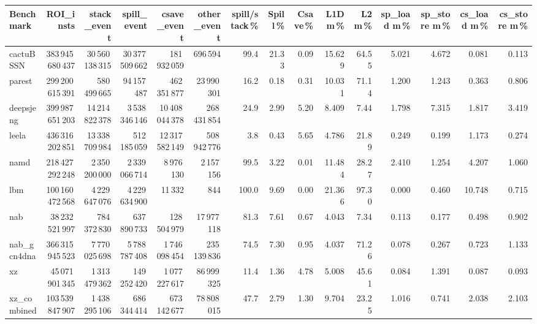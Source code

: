 \documentclass[9pt,landscape,a4paper]{article}
\begin{document}
\vspace{2mm}
\centering
\begin{adjustbox}{max width=\textwidth, max totalheight=0.50\textheight}%
\begin{tabular}{lrrrrrrrrrrrrrr}
\toprule
Benchmark & ROI\_insts & stack\_event & \textbf{spill\_event} & csave\_event & other\_event & spill/stack\,\% & Spill\,\% & Csave\,\% & L1D m\,\% & L2 m\,\% & sp\_load m\,\% & sp\_store m\,\% & cs\_load m\,\% & cs\_store m\,\% \\
\midrule
cactuBSSN & 383\,945\,680\,437 & 30\,560\,138\,315 & 30\,377\,509\,662 & 181\,932\,059 & 696\,594 & 99.4 & 21.33 & 0.09 & 15.629 & 64.55 & 5.021 & 4.672 & 0.081 & 0.113 \\
parest & 299\,200\,615\,391 & 580\,499\,665 & 94\,157\,487 & 462\,351\,877 & 23\,990\,301 & 16.2 & 0.18 & 0.31 & 10.031 & 71.14 & 1.200 & 1.243 & 0.363 & 0.806 \\
deepsjeng & 399\,987\,651\,203 & 14\,214\,822\,378 & 3\,538\,346\,146 & 10\,408\,044\,378 & 268\,431\,854 & 24.9 & 2.99 & 5.20 & 8.409 & 7.44 & 1.798 & 7.315 & 1.817 & 3.419 \\
leela & 436\,316\,202\,851 & 13\,338\,709\,984 & 512\,185\,059 & 12\,317\,582\,149 & 508\,942\,776 & 3.8 & 0.43 & 5.65 & 4.786 & 21.89 & 0.249 & 0.199 & 1.173 & 0.274 \\
namd & 218\,427\,292\,248 & 2\,350\,200\,000 & 2\,339\,066\,714 & 8\,976\,130 & 2\,157\,156 & 99.5 & 3.22 & 0.01 & 11.484 & 28.27 & 2.410 & 1.254 & 4.207 & 1.060 \\
lbm & 100\,160\,472\,568 & 4\,229\,647\,076 & 4\,229\,634\,900 & 11\,332 & 844 & 100.0 & 9.69 & 0.00 & 21.366 & 97.30 & 0.000 & 0.460 & 10.748 & 0.715 \\
nab & 38\,232\,521\,997 & 784\,372\,830 & 637\,890\,733 & 128\,504\,979 & 17\,977\,118 & 81.3 & 7.61 & 0.67 & 4.043 & 7.34 & 0.113 & 0.177 & 0.498 & 0.902 \\
nab\_gcn4dna & 366\,315\,945\,523 & 7\,770\,025\,698 & 5\,788\,787\,408 & 1\,746\,098\,454 & 235\,139\,836 & 74.5 & 7.30 & 0.95 & 4.037 & 71.26 & 0.078 & 0.267 & 0.723 & 1.133 \\
xz & 45\,071\,901\,345 & 1\,313\,479\,362 & 149\,252\,420 & 1\,077\,227\,617 & 86\,999\,325 & 11.4 & 1.36 & 4.78 & 5.008 & 45.61 & 0.084 & 1.391 & 0.087 & 0.093 \\
xz\_combined & 103\,539\,847\,907 & 1\,438\,295\,106 & 686\,344\,414 & 673\,142\,677 & 78\,808\,015 & 47.7 & 2.79 & 1.30 & 9.704 & 23.25 & 1.016 & 0.741 & 2.038 & 2.103 \\

\end{tabular}
\end{adjustbox}
\end{document}
